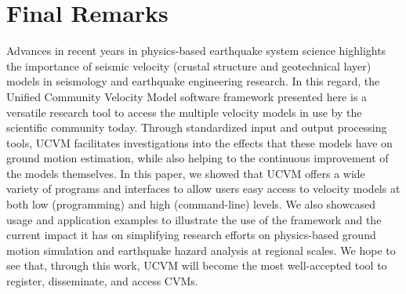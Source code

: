 
\section{Final Remarks}

Advances in recent years in physics-based earthquake system science highlights the importance of seismic velocity (crustal structure and geotechnical layer) models in seismology and earthquake engineering research. In this regard, the Unified Community Velocity Model software framework presented here is a versatile research tool to access the multiple velocity models in use by the scientific community today. Through standardized input and output processing tools, UCVM facilitates investigations into the effects that these models have on ground motion estimation, while also helping to the continuous improvement of the models themselves. In this paper, we showed that UCVM offers a wide variety of programs and interfaces to allow users easy access to velocity models at both low (programming) and high (command-line) levels. We also showcased usage and application examples to illustrate the use of the framework and the current impact it has on simplifying research efforts on physics-based ground motion simulation and earthquake hazard analysis at regional scales. We hope to see that, through this work, UCVM will become the most well-accepted tool to register, disseminate, and access CVMs.


